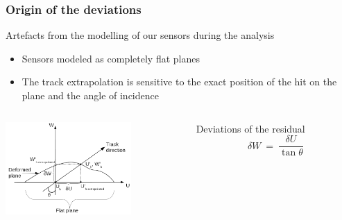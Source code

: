 \documentclass{beamer}
\begin{document}
  \begin{frame}
    \frametitle{Origin of the deviations}
    
    \begin{block}{Artefacts from the modelling of our sensors during the analysis}
      \begin{itemize}
        \item Sensors modeled as completely flat planes
        \item The track extrapolation is sensitive to the exact position of the hit on the plane and the angle of incidence
      \end{itemize}
    \end{block}

    \begin{columns}[c]
      \begin{column}{5cm}
        \vspace{-0.2cm}
        \begin{center}
          \includegraphics[width = 4.8cm]{Pictures/origin_deformation.png}
        \end{center}
      \end{column}

      \begin{column}{5cm}
        \begin{alertblock}{Deviations of the residual}
          \[ \delta W \ = \ \frac{\delta U}{\tan \theta}\]
        \end{alertblock}
      \end{column}
    \end{columns}

  \end{frame}
\end{document}
